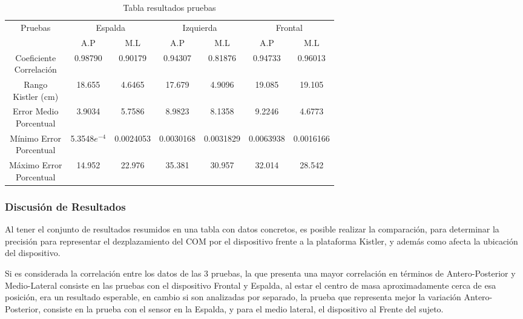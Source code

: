 \documentclass[12pt,a4paper]{article}
\begin{document}
\begin{table}[H]
	\centering
	\begin{tabular}{|c|c|c|c|c|c|c|}
		\hline
		\multirow{2}{*}{Pruebas} &
		\multicolumn{2}{c|}{Espalda} &
		\multicolumn{2}{c|}{Izquierda} &
		\multicolumn{2}{c|}{Frontal} \\
		\cline{2-7}
		& A.P & M.L & A.P  & M.L & A.P & M.L \\
		\hline
		\shortstack{Coeficiente\\Correlación} & 0.98790 &0.90179 & 0.94307 & 0.81876 & 0.94733 & 0.96013 \\
		\hline
		\shortstack{Rango\\Kistler (cm)} & 18.655 & 4.6465 & 17.679 & 4.9096 & 19.085 & 19.105 \\
		\hline
		\shortstack{Error Medio\\Porcentual} & 3.9034 & 5.7586 & 8.9823 & 8.1358 & 9.2246 & 4.6773 \\
		\hline
		\shortstack{Mínimo Error\\Porcentual} & 5.3548$e^{-4}$ & 0.0024053 & 0.0030168 & 0.0031829 & 0.0063938 & 0.0016166 \\
		\hline
		\shortstack{Máximo Error\\Porcentual} & 14.952 & 22.976 & 35.381& 30.957 & 32.014 & 28.542 \\
		\hline
	\end{tabular}
	\caption{Tabla resultados pruebas}
	\label{table:resultadosPruebas}
\end{table}	

\subsubsection{Discusión de Resultados}
Al tener el conjunto de resultados resumidos en una tabla con datos concretos, es posible realizar la comparación, para determinar la precisión para representar el dezplazamiento del COM por el dispositivo frente a la plataforma Kistler, y además como afecta la ubicación del dispositivo.

Si es considerada la correlación entre los datos de las 3 pruebas, la que presenta una mayor correlación en términos de Antero-Posterior y Medio-Lateral consiste en las pruebas con el dispositivo Frontal y Espalda, al estar el centro de masa aproximadamente cerca de esa posición, era un resultado esperable, en cambio si son analizadas por separado, la prueba que representa mejor la variación Antero-Posterior, consiste en la prueba con el sensor en la Espalda, y para el medio lateral, el dispositivo al Frente del sujeto.
\end{document}
